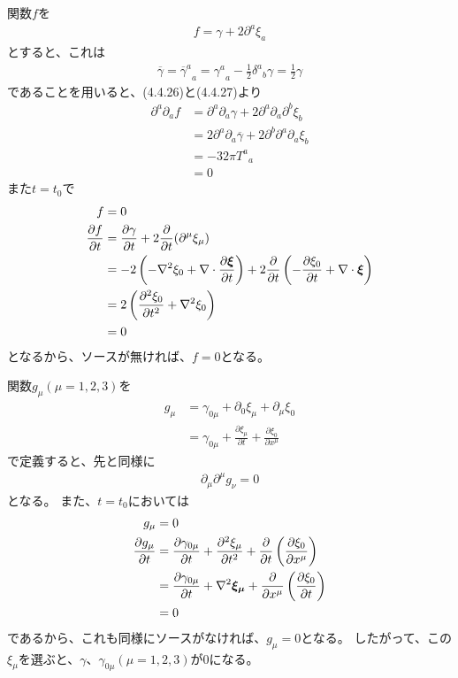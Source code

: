 \documentclass[a4paper]{jsarticle}
\def\vec#1{\mbox{\boldmath $#1$}}
\newcommand{\pdif}[2]{\frac{\partial #1}{\partial #2}}
\begin{document}
関数$f$を
\begin{align}
	f = \gamma + 2 \partial^a \xi_a
\end{align}
とすると、これは
\begin{align}
	\overline{\gamma} = {\overline{\gamma}^a}_a
	= {\gamma^a}_a - \frac{1}{2} {\delta^a}_b \gamma
	= \frac{1}{2} \gamma
\end{align}
であることを用いると、(4.4.26)と(4.4.27)より
\begin{align}
	\partial^a \partial_a f &= \partial^a \partial_a \gamma + 2 \partial^a \partial_a \partial^b \xi_b \\
	&= 2\partial^a \partial_a \overline{\gamma} + 2 \partial^b \partial^a \partial_a \xi_b \\
	&= -32 \pi {T^a}_a \\
	&= 0
\end{align}
また$t=t_0$で
\begin{align}
	f &= 0 \\
	\pdif{f}{t} &= \pdif{\gamma}{t} + 2 \pdif{}{t} ( \partial^{\mu} \xi_{\mu} ) \\
	&= -2 \left( -\nabla^2 \xi_0 + \nabla \cdot \pdif{\vec{\xi}}{t} \right) + 2 \pdif{}{t} \left( -\pdif{\xi_0}{t} + \nabla \cdot \vec{\xi} \right) \\
	&= 2 \left( \pdif{^2 \xi_0}{t^2} + \nabla^2 \xi_0 \right) \\
	&= 0
\end{align}
となるから、ソースが無ければ、$f=0$となる。

関数$g_{\mu} (\mu = 1, 2, 3)$を
\begin{align}
	g_{\mu} &= \gamma_{0\mu} + \partial_0 \xi_{\mu} + \partial_{\mu} \xi_0 \\
	&= \gamma_{0\mu} + \pdif{\xi_{\mu}}{t} + \pdif{\xi_0}{x^{\mu}}
\end{align}
で定義すると、先と同様に
\begin{align}
	\partial_{\mu} \partial^{\mu} g_{\nu} = 0
\end{align}
となる。
また、$t=t_0$においては
\begin{align}
	g_{\mu} &= 0 \\
	\pdif{g_{\mu}}{t} &= \pdif{\gamma_{0\mu}}{t} + \pdif{^2 \xi_{\mu}}{t^2} + \pdif{}{t} \left( \pdif{\xi_0}{x^{\mu}} \right) \\
	&= \pdif{\gamma_{0\mu}}{t} + \nabla^2 \vec{\xi_{\mu}} + \pdif{}{x^{\mu}} \left( \pdif{\xi_0}{t} \right) \\
	&= 0
\end{align}
であるから、これも同様にソースがなければ、$g_{\mu}=0$となる。
したがって、この$\xi_{\mu}$を選ぶと、$\gamma$、$\gamma_{0\mu} (\mu = 1, 2, 3)$が0になる。
\end{document}
